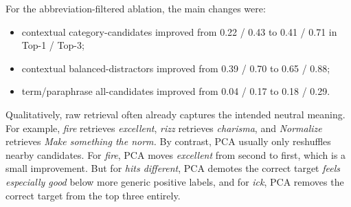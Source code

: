 \documentclass{article}
\begin{document}
For the abbreviation-filtered ablation, the main changes were:
\begin{itemize}
\item contextual category-candidates improved from 0.22 / 0.43 to 0.41 / 0.71 in Top-1 / Top-3;
\item contextual balanced-distractors improved from 0.39 / 0.70 to 0.65 / 0.88;
\item term/paraphrase all-candidates improved from 0.04 / 0.17 to 0.18 / 0.29.
\end{itemize}

Qualitatively, raw retrieval often already captures the intended neutral meaning.
For example, \emph{fire} retrieves \emph{excellent}, \emph{rizz} retrieves \emph{charisma}, and \emph{Normalize} retrieves \emph{Make something the norm.}
By contrast, PCA usually only reshuffles nearby candidates.
For \emph{fire}, PCA moves \emph{excellent} from second to first, which is a small improvement.
But for \emph{hits different}, PCA demotes the correct target \emph{feels especially good} below more generic positive labels, and for \emph{ick}, PCA removes the correct target from the top three entirely.
\end{document}
